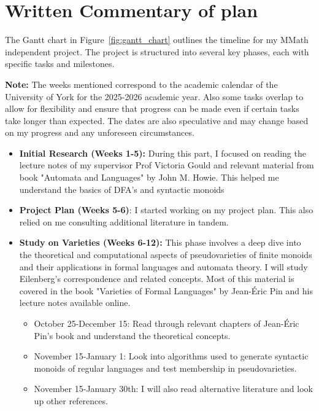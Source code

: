 \section*{Written Commentary of plan}
The Gantt chart in Figure~\ref{fig:gantt_chart} outlines the timeline for my MMath independent project. The project is structured into several key phases, each with specific tasks and milestones.

{\bf Note:} The weeks mentioned correspond to the academic calendar of the University of York for the 2025-2026 academic year. Also some tasks overlap to allow for flexibility and ensure that progress can be made even if certain tasks take longer than expected. The dates are also speculative and may change based on my progress and any unforeseen circumstances.

\begin{itemize}
	\item \textbf{Initial Research (Weeks 1-5):}  During this part, I focused on reading the lecture notes of my supervisor Prof Victoria Gould and relevant material from book "Automata and Languages" by John M. Howie. This helped me understand the basics of DFA's and syntactic monoids
	\item \textbf{Project Plan (Weeks 5-6)}: I started working on my project plan. This also relied on me consulting additional literature in tandem.
	\item \textbf{Study on Varieties (Weeks 6-12):} This phase involves a deep dive into the theoretical and computational aspects of pseudovarieties of finite monoids and their applications in formal languages and automata theory. I will study Eilenberg's correspondence and related concepts. Most of this material is covered in the book "Varieties of Formal Languages" by Jean-Éric Pin and his lecture notes available online.
	\begin{itemize}
		\item October 25-December 15: Read through relevant chapters of Jean-Éric Pin's book and understand the theoretical concepts.
		\item November 15-January 1: Look into algorithms used to generate syntactic monoids of regular languages and test membership in pseudovarieties.
		\item November 15-January 30th: I will also read alternative literature and look up other references.
		

\end{itemize}
\end{itemize}
